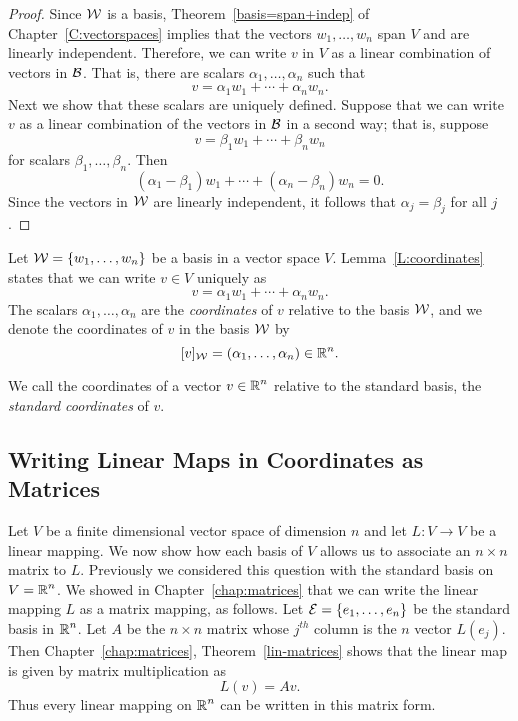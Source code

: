 \documentclass{ximera}
\begin{document}
\begin{proof}  Since ${\cal W}$ is a basis, Theorem~\ref{basis=span+indep} of
Chapter~\ref{C:vectorspaces} implies that the vectors $w_1,\ldots,w_n$ span
$V$ and are linearly independent.  Therefore, we can write $v$ in $V$ as a
linear combination of vectors in ${\cal B}$.   That is, there are scalars
$\alpha_1,\ldots,\alpha_n$ such that
\[
v = \alpha_1w_1 +\cdots + \alpha_nw_n.
\]
Next we show that these scalars are uniquely defined.  Suppose that we can 
write $v$ as a linear combination of the vectors in ${\cal B}$ in a second 
way; that is, suppose 
\[
v = \beta_1w_1 + \cdots + \beta_nw_n
\]
for scalars $\beta_1,\ldots,\beta_n$.  Then
\[
(\alpha_1-\beta_1)w_1 + \cdots + (\alpha_n-\beta_n)w_n = 0.
\]
Since the vectors in ${\cal W}$ are linearly independent, it
follows that $\alpha_j=\beta_j$ for all $j$.  \end{proof}

\begin{definition}  \label{D:coordinates}
Let ${\cal W} = \{w_1,\ldots,w_n\}$ be a basis in a vector space $V$.
Lemma~\ref{L:coordinates} states that we can write $v\in V$ uniquely as
\begin{equation}  \label{e:coordv}
v = \alpha_1w_1 + \cdots + \alpha_nw_n.
\end{equation}
The scalars $\alpha_1,\ldots,\alpha_n$ are the {\em coordinates\/} of $v$
relative to the basis ${\cal W}$, and we denote the coordinates of $v$ in
the basis ${\cal W}$ by
\begin{equation}   \label{e:coordnot}
[v]_{\cal W} = (\alpha_1,\ldots,\alpha_n) \in\mbox{$\Bbb{R}$}^n.
\end{equation}
\end{definition}

We call the coordinates of a vector $v\in\mbox{$\Bbb{R}$}^n$ relative to the standard basis,
the {\em standard coordinates\/} of $v$.

\subsection*{Writing Linear Maps in Coordinates as Matrices}

Let $V$ be a finite dimensional vector space of dimension
$n$ and let
$L:V\to V$ be a linear mapping.
We now show how each basis of $V$ allows
us to associate an $n\times n$ matrix to $L$.  Previously we considered
this question with the standard basis on $V=\mbox{$\Bbb{R}$}^n$. We showed in
Chapter~\ref{chap:matrices} that
we can write the linear mapping $L$ as a
matrix mapping, as
follows.  Let ${\cal E}=\{e_1,\ldots,e_n\}$ be the standard
basis in $\mbox{$\Bbb{R}$}^n$.  Let $A$ be the $n\times n$ matrix whose
$j^{th}$ column is the $n$ vector $L(e_j)$.  Then
Chapter~\ref{chap:matrices}, Theorem~\ref{lin-matrices} shows
that the linear map is given by matrix multiplication as
\[
L(v) = Av.
\]
Thus every linear mapping on $\mbox{$\Bbb{R}$}^n$ can be written in this matrix form.
\end{document}
